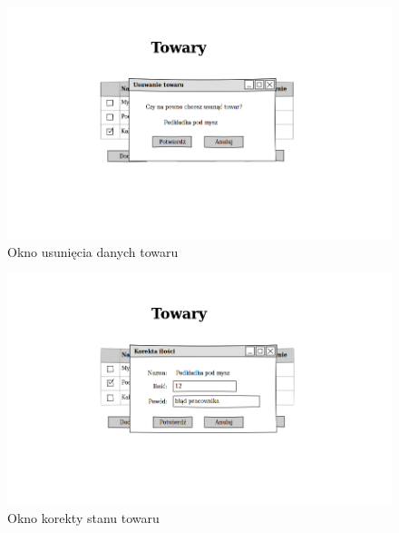 \begin{figure}[!htb]
  \begin{center}
    \includegraphics[scale=0.45]{../img/interfejs/usuniecie-danych-towaru.png}
  \end{center}
  \caption{Okno usunięcia danych towaru}
\end{figure}
\FloatBarrier

\begin{figure}[!htb]
  \begin{center}
    \includegraphics[scale=0.45]{../img/interfejs/korekta-ilosci-towaru.png}
  \end{center}
  \caption{Okno korekty stanu towaru}
\end{figure}
\FloatBarrier

